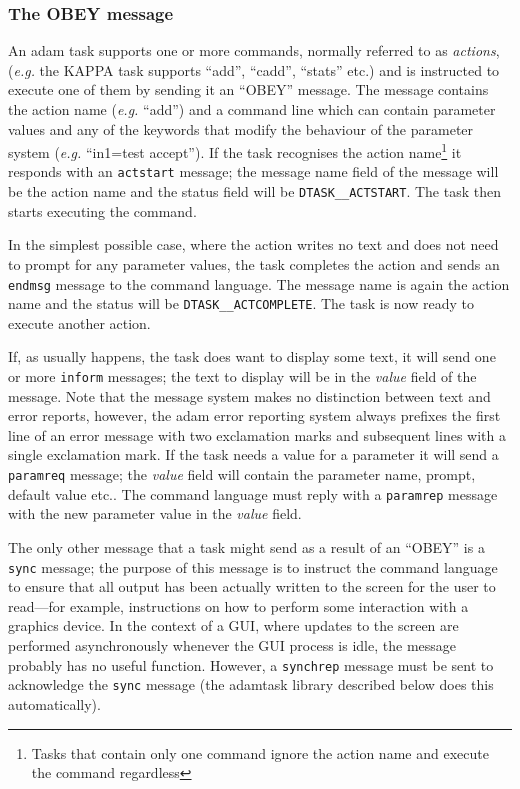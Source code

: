 \documentclass[twoside,11pt,nolof]{starlink}
\begin{document}
\subsubsection{The OBEY message}

An adam task supports one or more commands, normally referred to as
\emph{actions}, ({\em{e.g.}} the KAPPA task supports ``add'', ``cadd'',
``stats'' etc.) and is instructed to execute one of them by sending it
an ``OBEY'' message. The message contains the action name ({\em{e.g.}} ``add'')
and a command line which can contain parameter values and any of the
keywords that modify the behaviour of the parameter system ({\em{e.g.}}
``in1=test accept''). If the task recognises the action
name\footnote{Tasks that contain only one command ignore the action
name and execute the command regardless} it responds with an \texttt{actstart} message; the message name field of the message will be the
action name and the status field will be \texttt{DTASK\_\_ACTSTART}. The
task then starts executing the command.

In the simplest possible case, where the action writes no text and does
not need to prompt for any parameter values, the task completes the action
and sends an \texttt{endmsg} message to the command language. The message name
is again the action name
and the status will be \texttt{DTASK\_\_ACTCOMPLETE}. The task is now ready to
execute another action.

If, as usually happens, the task does want to display some text, it will send
one or more \texttt{inform} messages; the text to display will be in the \emph{value} field of the message. Note that the message system makes no distinction
between text and error reports, however, the adam error reporting system
always prefixes the first line of an error message with two exclamation marks
and subsequent lines with a single exclamation mark. If the task needs
a value for a parameter it will send a \texttt{paramreq} message; the \emph{value}
field will contain the parameter name, prompt, default
value etc.. The command language must reply with a \texttt{paramrep} message
with the new parameter value in the \emph{value} field.

The only other message that a task might send as a result of an ``OBEY'' is
a \texttt{sync} message; the purpose of this message is to instruct the command
language to ensure that all output has been actually written to the screen
for the user to read---for example, instructions on how to perform some
interaction with a graphics device. In the context of a GUI, where updates
to the screen are performed asynchronously whenever the GUI process is idle,
the message probably has no useful function. However, a \texttt{synchrep}
message must be sent to acknowledge the \texttt{sync} message (the adamtask
library described below does this automatically).
\end{document}

